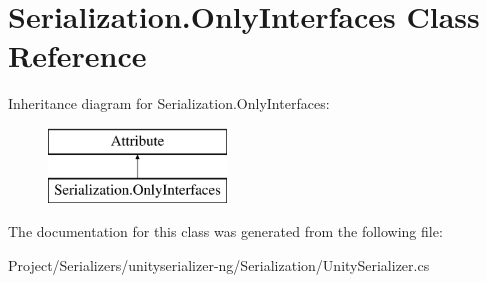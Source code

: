 \hypertarget{class_serialization_1_1_only_interfaces}{}\section{Serialization.\+Only\+Interfaces Class Reference}
\label{class_serialization_1_1_only_interfaces}
Inheritance diagram for Serialization.\+Only\+Interfaces\+:\begin{figure}[H]
\begin{center}
\leavevmode
\includegraphics[height=2.000000cm]{class_serialization_1_1_only_interfaces}
\end{center}
\end{figure}


The documentation for this class was generated from the following file\+:\begin{DoxyCompactItemize}
\item 
Project/\+Serializers/unityserializer-\/ng/\+Serialization/Unity\+Serializer.\+cs\end{DoxyCompactItemize}
